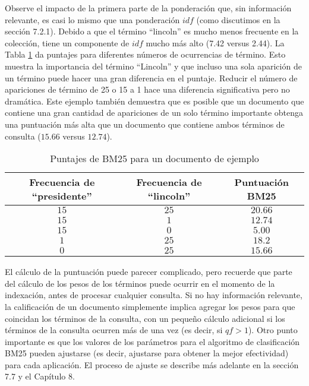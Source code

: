 Observe el impacto de la primera parte de la ponderación que, sin información relevante, es casi lo mismo que una ponderación $idf$ (como discutimos en la sección 7.2.1). Debido a que el término ``lincoln'' es mucho menos frecuente en la colección, tiene un componente de $idf$ mucho más alto (7.42 versus 2.44). La Tabla \ref{tab:BM25Puntajes} da puntajes para diferentes números de ocurrencias de término. Esto muestra la importancia del término ``Lincoln'' y que incluso una sola aparición de un término puede hacer una gran diferencia en el puntaje. Reducir el número de apariciones de término de 25 o 15 a 1 hace una diferencia significativa pero no dramática. Este ejemplo también demuestra que es posible que un documento que contiene una gran cantidad de apariciones de un solo término importante obtenga una puntuación más alta que un documento que contiene ambos términos de consulta ($15.66$ versus $12.74$).

\begin{table}[H]
	\begin{center}
		\begin{tabular}{c|c|c}
			\hline			
			 Frecuencia de ``presidente'' & Frecuencia de ``lincoln'' & Puntuación BM25 \\ \hline
			$15$ & $25$ & $20.66$ \\ 
			$15$ & $1$ & $12.74$ \\  
			$15$ & $0$ & $5.00$ \\  
			$1$ & $25$ & $18.2$ \\  
			$0$ & $25$ & $15.66$ \\ \hline  
			
		\end{tabular}
	\end{center}
	\caption{\label{tab:BM25Puntajes}Puntajes de BM25 para un documento de ejemplo}
\end{table}

El cálculo de la puntuación puede parecer complicado, pero recuerde que parte del cálculo de los pesos de los términos puede ocurrir en el momento de la indexación, antes de procesar cualquier consulta. Si no hay información relevante, la calificación de un documento simplemente implica agregar los pesos para que coincidan los términos de la consulta, con un pequeño cálculo adicional si los términos de la consulta ocurren más de una vez (es decir, si $qf > 1$). Otro punto importante es que los valores de los parámetros para el algoritmo de clasificación BM25 pueden ajustarse (es decir, ajustarse para obtener la mejor efectividad) para cada aplicación. El proceso de ajuste se describe más adelante en la sección 7.7 y el Capítulo 8.

